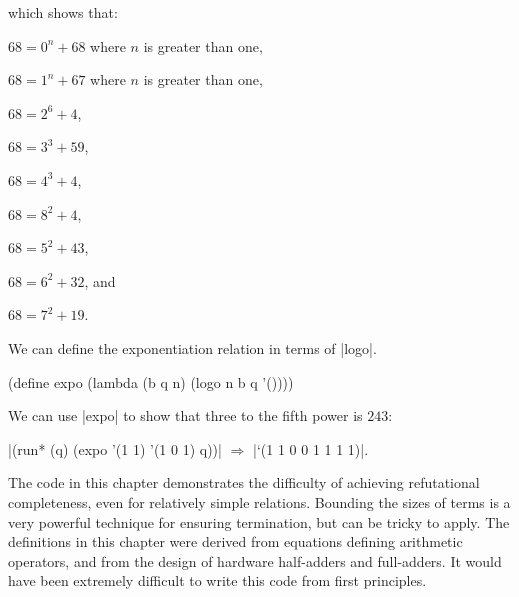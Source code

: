 \noindent which shows that:

\noindent$68 = 0^n + 68$ where $n$ is greater than one,

\nspace

\noindent$68 = 1^n + 67$ where $n$ is greater than one,

\nspace

\noindent$68 = 2^6 + 4$,

\nspace

\noindent$68 = 3^3 + 59$,

\nspace

\noindent$68 = 4^3 + 4$,

\nspace

\noindent$68 = 8^2 + 4$, 

\nspace

\noindent$68 = 5^2 + 43$, 

\nspace

\noindent$68 = 6^2 + 32$, and

\nspace

\noindent$68 = 7^2 + 19$.

We can define the exponentiation relation in terms of \scheme|logo|.

\schemedisplayspace
\begin{schemedisplay}
(define expo (lambda (b q n) (logo n b q '())))
\end{schemedisplay}

\noindent We can use \scheme|expo| to show that three to the fifth
power is $243$:

\wspace

\noindent \scheme|(run* (q) (expo '(1 1) '(1 0 1) q))| $\Rightarrow$ \scheme|`(1 1 0 0 1 1 1 1)|.

\wspace

The code in this chapter demonstrates the difficulty of achieving
refutational completeness, even for relatively simple relations.
Bounding the sizes of terms is a very powerful technique for ensuring
termination, but can be tricky to apply.  The definitions in this
chapter were derived from equations defining arithmetic operators, and
from the design of hardware half-adders and full-adders.  It would
have been extremely difficult to write this code from first
principles.

